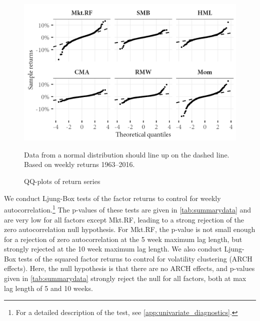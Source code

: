 \begin{figure}[ht!]
  \centering
  \footnotesize
  \includegraphics[scale=1]{graphics/qq_returns.png}
  \caption{QQ-plots of return series}
  \begin{longcaption}
    Data from a normal distribution should line up on the dashed line. Based on weekly returns 1963--2016.
  \end{longcaption}
  \label{fig:qq_returns}
\end{figure}

We conduct Ljung-Box tests of the factor returns to control for weekly autocorrelation.\footnote{For a detailed description of the test, see \autoref{app:univariate_diagnostics}.} The p-values of these tests are given in \autoref{tab:summarydata} and are very low for all factors except Mkt.RF, leading to a strong rejection of the zero autocorrelation null hypothesis. For Mkt.RF, the p-value is not small enough for a rejection of zero autocorrelation at the 5 week maximum lag length, but strongly rejected at the 10 week maximum lag length. We also conduct Ljung-Box tests of the squared factor returns to control for volatility clustering (ARCH effects). Here, the null hypothesis is that there are no ARCH effects, and p-values given in \autoref{tab:summarydata} strongly reject the null for all factors, both at max lag length of 5 and 10 weeks.

